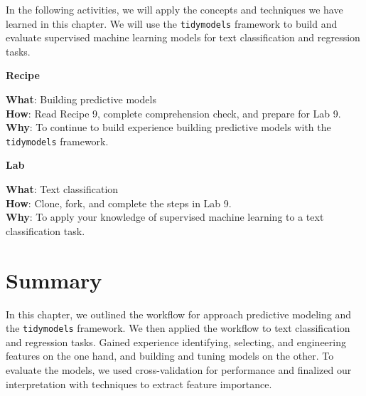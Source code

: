 \documentclass[
  letterpaper,
]{latex/krantz}
\theoremstyle{definition}
\theoremstyle{remark}
\begin{document}

In the following activities, we will apply the concepts and techniques
we have learned in this chapter. We will use the \texttt{tidymodels}
framework to build and evaluate supervised machine learning models for
text classification and regression tasks.

\begin{tcolorbox}[enhanced jigsaw, colframe=quarto-callout-color-frame, breakable, bottomrule=.15mm, arc=.35mm, left=2mm, opacityback=0, rightrule=.15mm, colback=white, toprule=.15mm, leftrule=.75mm]

\textbf{ Recipe}

\textbf{What}: Building predictive models\\
\textbf{How}: Read Recipe 9, complete comprehension check, and prepare
for Lab 9.\\
\textbf{Why}: To continue to build experience building predictive models
with the \texttt{tidymodels} framework.

\end{tcolorbox}

\begin{tcolorbox}[enhanced jigsaw, colframe=quarto-callout-color-frame, breakable, bottomrule=.15mm, arc=.35mm, left=2mm, opacityback=0, rightrule=.15mm, colback=white, toprule=.15mm, leftrule=.75mm]

\textbf{ Lab}

\textbf{What}: Text classification\\
\textbf{How}: Clone, fork, and complete the steps in Lab 9.\\
\textbf{Why}: To apply your knowledge of supervised machine learning to
a text classification task.

\end{tcolorbox}

\section*{Summary}\label{summary-8}


In this chapter, we outlined the workflow for approach predictive
modeling and the \texttt{tidymodels} framework. We then applied the
workflow to text classification and regression tasks. Gained experience
identifying, selecting, and engineering features on the one hand, and
building and tuning models on the other. To evaluate the models, we used
cross-validation for performance and finalized our interpretation with
techniques to extract feature importance.
\end{document}
